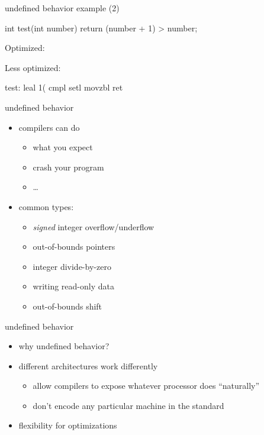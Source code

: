 \begin{frame}[fragile,label=undefExample2]{undefined behavior example (2)}
\small
\begin{ccodeNL}
int test(int number) {
    return (number + 1) > number;
}
\end{ccodeNL}
Optimized:
\vspace{-1mm}

Less optimized:
\vspace{-1mm}
\begin{asmcodeNL}
test:
    leal    1(%
    cmpl    %
    setl    %
    movzbl  %
    ret
\end{asmcodeNL}
\end{frame}

\begin{frame}{undefined behavior}
\begin{itemize}
\item compilers can do 
    \begin{itemize}
        \item what you expect
        \item crash your program
        \item \ldots{}
    \end{itemize}
\item common types:
    \begin{itemize}
        \item \textit{signed} integer overflow/underflow
        \item out-of-bounds pointers
        \item integer divide-by-zero
        \item writing read-only data
        \item out-of-bounds shift
    \end{itemize}
\end{itemize}
\end{frame}

\begin{frame}{undefined behavior}
    \begin{itemize}
    \item why undefined behavior?
    \vspace{.5cm}
    \item different architectures work differently
    \begin{itemize}
        \item allow compilers to expose whatever processor does ``naturally''
        \item don't encode any particular machine in the standard
    \end{itemize}
    \item flexibility for optimizations
    \end{itemize}
\end{frame}


